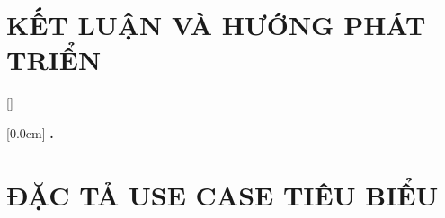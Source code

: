 \documentclass[a4paper,13pt,3p,twoside]{report}
\renewcommand{\bibname}{Danh_sach_tai_lieu_tham_khao}
\theoremstyle{definition}
\begin{document}
\chapter{KẾT LUẬN VÀ HƯỚNG PHÁT TRIỂN} %
\label{chapter:conclusion}


\newpage
\renewcommand\bibname{TÀI LIỆU THAM KHẢO}
\printbibliography
{}

\appendixpage
\appendices
\addappheadtotoc


{}[]
\titlespacing*{\chapter}{0pt}{-20pt}{20pt}

    [0.0cm]             %
    {\bfseries\vspace{0.3cm}}                  %
    {{\bfseries{\scshape} \thecontentslabel.\ }} %
    {}         %
    {\contentspage}         %
\chapter{ĐẶC TẢ USE CASE TIÊU BIỂU}

\end{document}
